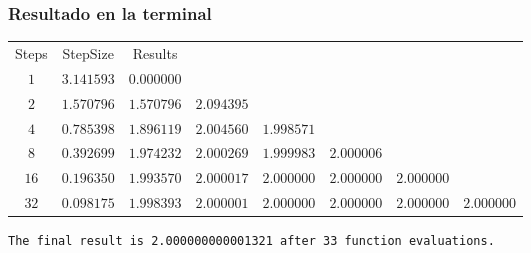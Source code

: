 \begin{frame}[fragile]
\frametitle{Resultado en la terminal}
\fontsize{8}{8}\selectfont
\begin{table}
\begin{tabular}{c c c c c c c c}
Steps & StepSize & Results & & & & & \\
$1$ & $3.141593$ & $0.000000$ & & & & & \\
$2$ & $1.570796$ & $1.570796$ & $2.094395$ & & & & \\
$4$ & $0.785398$ & $1.896119$ & $2.004560$ & $1.998571$ & & & \\
$8$ & $0.392699$ & $1.974232$ & $2.000269$ & $1.999983$ & $2.000006$ & & \\ 
$16$ & $0.196350$ & $1.993570$ & $2.000017$ & $2.000000$ & $2.000000$ & $2.000000$ & \\ 
$32$ & $0.098175$ & $1.998393$ & $2.000001$ & $2.000000$ & $2.000000$ & $2.000000$ & $2.000000$ \\
\end{tabular}
\end{table}
\begin{verbatim}
The final result is 2.000000000001321 after 33 function evaluations.
\end{verbatim}
\end{frame}
